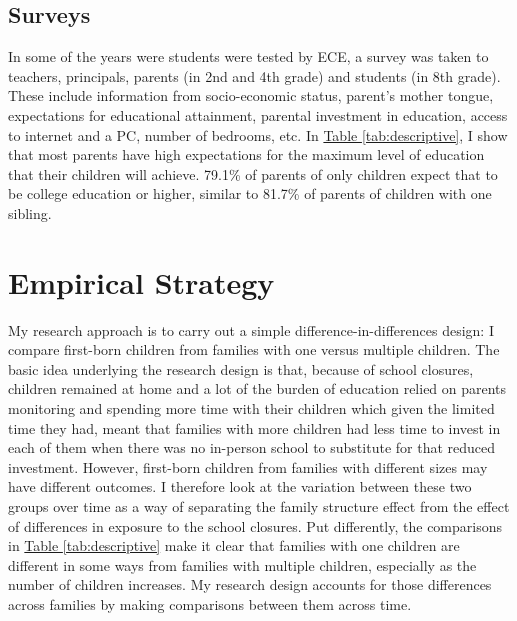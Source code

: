 \subsection{Surveys}

In some of the years were students were tested by ECE, a survey was taken to teachers, principals, parents (in 2nd and 4th grade) and students (in 8th grade). These include information from socio-economic status, parent's mother tongue, expectations for educational attainment, parental investment in education, access to internet and a PC, number of bedrooms, etc. In \hyperref[tab:descriptive]{Table \ref{tab:descriptive}}, I show that most parents have high expectations for the maximum level of education that their children will achieve. 79.1\% of parents of only children expect that to be college education or higher, similar to 81.7\% of parents of children with one sibling.






\section{Empirical Strategy}\label{sec:empirical_strategy}

My research approach is to carry out a simple difference-in-differences design: I compare first-born children from families with one versus multiple children. The basic idea underlying the research design is that, because of school closures, children remained at home and a lot of the burden of education relied on parents monitoring and spending more time with their children which given the limited time they had, meant that families with more children had less time to invest in each of them when there was no in-person school to substitute for that reduced investment. However, first-born children from families with different sizes may have different outcomes. I therefore look at the variation between these two groups over time as a way of separating the family structure effect from the effect of differences in exposure to the school closures. Put differently, the comparisons in \hyperref[tab:descriptive]{Table \ref{tab:descriptive}} make it clear that families with one children are different in some ways from families with multiple children, especially as the number of children increases. My research design accounts for those differences across families by making comparisons between them across time.

